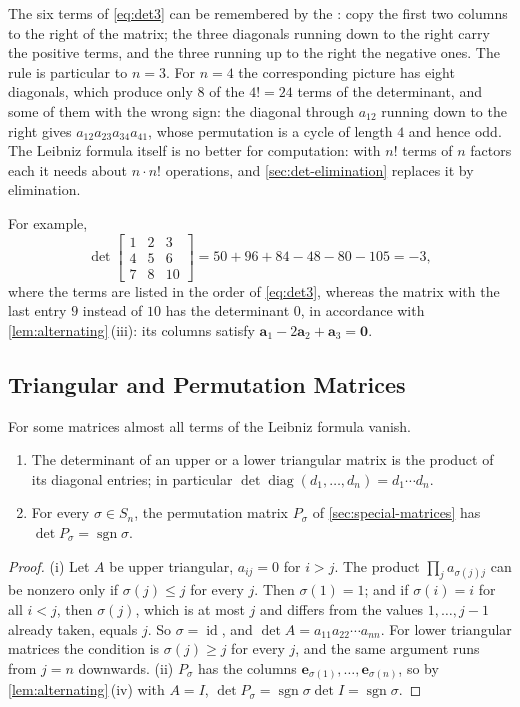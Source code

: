 The six terms of \eqref{eq:det3} can be remembered by the : copy the first two columns to the right of the matrix; the three diagonals running down to the right carry the positive terms, and the three running up to the right the negative ones. The rule is particular to $n=3$. For $n=4$ the corresponding picture has eight diagonals, which produce only $8$ of the $4!=24$ terms of the determinant, and some of them with the wrong sign: the diagonal through $a_{12}$ running down to the right gives $a_{12}a_{23}a_{34}a_{41}$, whose permutation is a cycle of length $4$ and hence odd. The Leibniz formula itself is no better for computation: with $n!$ terms of $n$ factors each it needs about $n\cdot n!$ operations, and \cref{sec:det-elimination} replaces it by elimination.

For example,
\[
\det\begin{bmatrix}1&2&3\\4&5&6\\7&8&10\end{bmatrix}=50+96+84-48-80-105=-3,
\]
where the terms are listed in the order of \eqref{eq:det3}, whereas the matrix with the last entry $9$ instead of $10$ has the determinant $0$, in accordance with \cref{lem:alternating}\,(iii): its columns satisfy $\mathbf a_1-2\mathbf a_2+\mathbf a_3=\mathbf 0$.

\subsection{Triangular and Permutation Matrices}

For some matrices almost all terms of the Leibniz formula vanish.

\begin{proposition}
\label{prop:det-triangular}
\leavevmode
\begin{enumerate}
\item The determinant of an upper or a lower triangular matrix is the product of its diagonal entries; in particular $\det\operatorname{diag}(d_1,\ldots,d_n)=d_1\cdots d_n$.
\item For every $\sigma\in S_n$, the permutation matrix $P_\sigma$ of \cref{sec:special-matrices} has $\det P_\sigma=\operatorname{sgn}\sigma$.
\end{enumerate}
\end{proposition}

\begin{proof}
(i) Let $A$ be upper triangular, $a_{ij}=0$ for $i>j$. The product $\prod_ja_{\sigma(j)j}$ can be nonzero only if $\sigma(j)\le j$ for every $j$. Then $\sigma(1)=1$; and if $\sigma(i)=i$ for all $i<j$, then $\sigma(j)$, which is at most $j$ and differs from the values $1,\ldots,j-1$ already taken, equals $j$. So $\sigma=\operatorname{id}$, and $\det A=a_{11}a_{22}\cdots a_{nn}$. For lower triangular matrices the condition is $\sigma(j)\ge j$ for every $j$, and the same argument runs from $j=n$ downwards. (ii) $P_\sigma$ has the columns $\mathbf e_{\sigma(1)},\ldots,\mathbf e_{\sigma(n)}$, so by \cref{lem:alternating}\,(iv) with $A=I$, $\det P_\sigma=\operatorname{sgn}\sigma\det I=\operatorname{sgn}\sigma$.
\end{proof}

